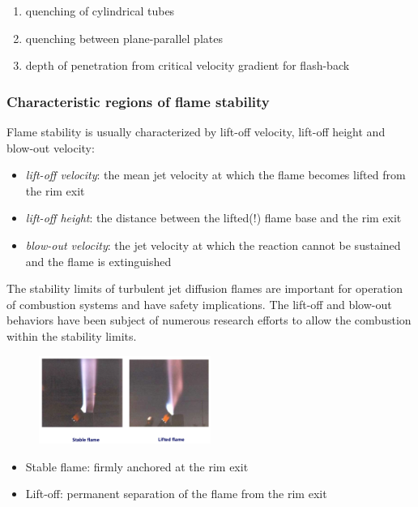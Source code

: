 \documentclass[12pt]{article}
\begin{document}
\begin{enumerate}
    \item quenching of cylindrical tubes
    \item quenching between plane-parallel plates
    \item depth of penetration from critical velocity gradient for flash-back
\end{enumerate}

\subsubsection{Characteristic regions of flame stability}

Flame stability is usually characterized by lift-off velocity, lift-off height and blow-out velocity:

\begin{itemize}
    \item \textit{lift-off velocity}: the mean jet velocity at which the flame becomes lifted from the rim exit
    \item \textit{lift-off height}: the distance between the lifted(!) flame base and the rim exit
    \item \textit{blow-out velocity}: the jet velocity at which the reaction cannot be sustained and the flame is extinguished
\end{itemize}

The stability limits of turbulent jet diffusion flames are important for operation of combustion systems and have safety implications. The lift-off and blow-out behaviors have been subject of numerous research efforts to allow the combustion within the stability limits.

\begin{figure}[!ht]
\centering
\includegraphics[width=0.5\textwidth]{figures/stableflame.png}
\end{figure}

\begin{itemize}
    \item Stable flame: firmly anchored at the rim exit
    \item Lift-off: permanent separation of the flame from the rim exit
\end{itemize}
\end{document}
